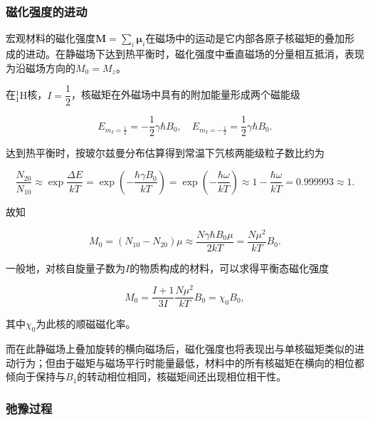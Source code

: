 \subsubsection{磁化强度的进动}\label{ux78c1ux5316ux5f3aux5ea6ux7684ux8fdbux52a8}

宏观材料的磁化强度\(\boldsymbol{M}=\sum_i{\boldsymbol{\mu}_i}\)在磁场中的运动是它内部各原子核磁矩的叠加形成的进动。在静磁场下达到热平衡时，磁化强度中垂直磁场的分量相互抵消，表现为沿磁场方向的\(M_0=M_z\)。

在\(^1_1\mathrm{H}\)核，\(I=\dfrac{1}{2}\)，核磁矩在外磁场中具有的附加能量形成两个磁能级

\begin{equation}
E_{m_{I}=\frac{1}{2}}=-\dfrac{1}{2}\gamma\hbar B_0,\quad E_{m_I=-\frac{1}{2}}=\dfrac{1}{2}\gamma\hbar B_0.
\end{equation}

达到热平衡时，按玻尔兹曼分布估算得到常温下氕核两能级粒子数比约为

\begin{equation}
\dfrac{N_{20}}{N_{10}}\approx\exp{\dfrac{\Delta E}{kT}}=\exp{\left(-\dfrac{\hbar \gamma B_0}{kT}\right)}=\exp{\left(-\dfrac{\hbar\omega}{kT}\right)}\approx1-\dfrac{\hbar\omega}{kT}=0.999993\approx 1.
\end{equation}

故知

\begin{equation}
M_0 = (N_{10}-N_{20})\mu\approx \dfrac{N\gamma\hbar B_0\mu}{2kT}=\dfrac{N\mu^2}{kT}B_0.
\end{equation}

一般地，对核自旋量子数为\(I\)的物质构成的材料，可以求得平衡态磁化强度

\begin{equation}
M_0=\dfrac{I+1}{3I}\dfrac{N\mu^2}{kT}B_0=\chi_0 B_0,
\end{equation}

其中\(\chi_0\)为此核的顺磁磁化率。

而在此静磁场上叠加旋转的横向磁场后，磁化强度也将表现出与单核磁矩类似的进动行为；但由于磁矩与磁场平行时能量最低，材料中的所有核磁矩在横向的相位都倾向于保持与\(B_1\)的转动相位相同，核磁矩间还出现相位相干性。

\subsubsection{弛豫过程}\label{ux5f1bux8c6bux8fc7ux7a0b}

